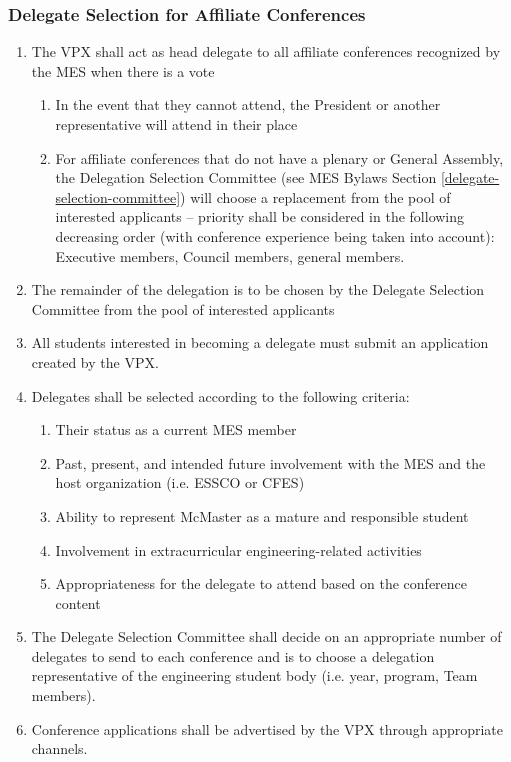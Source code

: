 \subsubsection{Delegate Selection for Affiliate Conferences}
\label{delegate-selection-for-affiliate-conferences}
\begin{enumerate}
 \item
  The VPX shall act as head delegate to all affiliate conferences recognized by the MES when there is a vote

  \begin{enumerate}
   \item
    In the event that they cannot attend, the President or another representative will attend in their place
   \item
    For affiliate conferences that do not have a plenary or General Assembly, the Delegation Selection Committee (see MES Bylaws Section \ref{delegate-selection-committee}) will choose a replacement from the pool of interested applicants -- priority shall be considered in the following decreasing order (with conference experience being taken into account): Executive members, Council members, general members.
  \end{enumerate}
 \item
  The remainder of the delegation is to be chosen by the Delegate Selection Committee from the pool of interested applicants
 \item
  All students interested in becoming a delegate must submit an application created by the VPX.
 \item
  Delegates shall be selected according to the following criteria:

  \begin{enumerate}
   \item
    Their status as a current MES member
   \item
    Past, present, and intended future involvement with the MES and the host organization (i.e. ESSCO or CFES)
   \item
    Ability to represent McMaster as a mature and responsible student
   \item
    Involvement in extracurricular engineering-related activities
   \item
    Appropriateness for the delegate to attend based on the conference content
  \end{enumerate}
 \item
  The Delegate Selection Committee shall decide on an appropriate number of delegates to send to each conference and is to choose a delegation representative of the engineering student body (i.e. year, program, Team members).
 \item
  Conference applications shall be advertised by the VPX through appropriate channels.

\end{enumerate}

